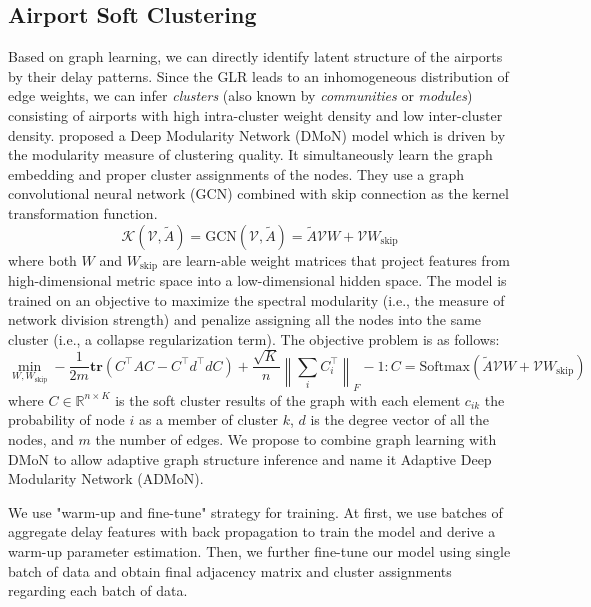 \subsection{Airport Soft Clustering}

Based on graph learning, we can directly identify latent structure of the airports by their delay patterns. Since the GLR leads to an inhomogeneous distribution of edge weights, we can infer \emph{clusters} (also known by \emph{communities} or \emph{modules}) consisting of airports with high intra-cluster weight density and low inter-cluster density. \citet{tsitsulin2020graph} proposed a Deep Modularity Network (DMoN) model which is driven by the modularity measure of clustering quality. It simultaneously learn the graph embedding and proper cluster assignments of the nodes. They use a graph convolutional neural network (GCN) \citep{https://doi.org/10.48550/arxiv.1609.02907} combined with skip connection as the kernel transformation function.
\begin{equation}
    \mathcal{K}(\mathcal{V},\tilde{A})=\text{GCN}(\mathcal{V},\tilde{A})=\tilde{A}\mathcal{V}W+\mathcal{V}W_{\text{skip}}
\end{equation}
where both $W$ and $W_{\text{skip}}$ are learn-able weight matrices that project features from high-dimensional metric space into a low-dimensional hidden space. The model is trained on an objective to maximize the spectral modularity (i.e., the measure of network division strength) and penalize assigning all the nodes into the same cluster (i.e., a collapse regularization term). The objective problem is as follows:
\begin{equation}
    \min_{W,W_{\text{skip}}}-\frac{1}{2m}\mathbf{tr}(C^\intercal AC-C^\intercal d^\intercal dC)+\frac{\sqrt{K}}{n}\left\|\sum_iC_i^\intercal\right\|_F-1: C=\text{Softmax}(\tilde{A}\mathcal{V}W+\mathcal{V}W_{\text{skip}})
\end{equation}
where $C\in\mathbb{R}^{n\times K}$ is the soft cluster results of the graph with each element $c_{ik}$ the probability of node $i$ as a member of cluster $k$, $d$ is the degree vector of all the nodes, and $m$ the number of edges. We propose to combine graph learning with DMoN to allow adaptive graph structure inference and name it Adaptive Deep Modularity Network (ADMoN).

We use "warm-up and fine-tune" strategy for training. At first, we use batches of aggregate delay features with back propagation to train the model and derive a warm-up parameter estimation. Then, we further fine-tune our model using single batch of data and obtain final adjacency matrix and cluster assignments regarding each batch of data.

